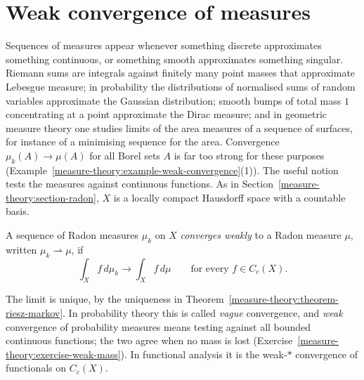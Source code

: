 \section{Weak convergence of measures}\label{measure-theory:section-weak-convergence}

Sequences of measures appear whenever something discrete approximates something continuous, or something smooth approximates something singular. Riemann sums are integrals against finitely many
point masses that approximate Lebesgue measure; in probability the distributions of normalised sums of random variables approximate the Gaussian distribution; smooth bumps of total mass $1$
concentrating at a point approximate the Dirac measure; and in geometric measure theory one studies limits of the area measures of a sequence of surfaces, for instance of a minimising sequence for
the area. Convergence $\mu_k(A) \to \mu(A)$ for all Borel sets $A$ is far too strong for these purposes (Example~\ref{measure-theory:example-weak-convergence}(1)). The useful notion tests the measures
against continuous functions. As in Section~\ref{measure-theory:section-radon}, $X$ is a locally compact Hausdorff space with a countable basis.

\begin{definition}\label{measure-theory:definition-weak-convergence}
A sequence of Radon measures $\mu_k$ on $X$ \emph{converges weakly} to a Radon measure $\mu$, written $\mu_k \rightharpoonup \mu$, if
\[
\int_Xf\,d\mu_k \to \int_Xf\,d\mu \qquad \text{for every } f \in C_c(X).
\]
\end{definition}

The limit is unique, by the uniqueness in Theorem~\ref{measure-theory:theorem-riesz-markov}. In probability theory this is called \emph{vague} convergence, and \emph{weak} convergence of probability
measures means testing against all bounded continuous functions; the two agree when no mass is lost (Exercise~\ref{measure-theory:exercise-weak-mass}). In functional analysis it is the weak-$*$
convergence of functionals on $C_c(X)$.

